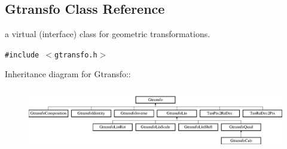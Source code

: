 \subsection{Gtransfo  Class Reference}
\label{class_gtransfo}
a virtual (interface) class for geometric transformations. 


{\tt \#include $<$gtransfo.h$>$}

Inheritance diagram for Gtransfo::\begin{figure}[H]
\begin{center}
\leavevmode
\includegraphics[height=2.7451cm]{class_gtransfo}
\end{center}
\end{figure}
